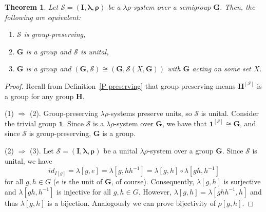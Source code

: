 \documentclass{amsart}
\newtheorem{theorem}{Theorem}
\newcommand{\blambda}{\boldsymbol{\lambda}}
\newcommand{\brho}{\boldsymbol{\rho}}
\begin{document}
\begin{theorem}\label{wr-prod}
Let $\mathcal{S} = (\mathbf{I},\blambda,\brho)$  be a
$\lambda\rho$-system over a semigroup $\mathbf{G}$.
Then, the following are equivalent:
\begin{enumerate}
\item $\mathcal{S}$ is group-preserving,
\item $\mathbf{G}$ is a group and $\mathcal{S}$ is unital,
\item $\mathbf{G}$ is a group and
  $(\mathbf{G},\mathcal{S})\cong (\mathbf{G},\mathcal{S}(X,\mathbf{G}))$
with $\mathbf{G}$ acting on some set $X$. 
\end{enumerate}
\end{theorem} 
\begin{proof}
Recall from Definition~\ref{P-preserving} that group-preserving means
$\mathbf{H}^{[\mathcal{S}]}$ is a group for any group $\mathbf{H}$.  

\smallskip\noindent
(1) $\Rightarrow$ (2). Group-preserving
$\lambda\rho$-systems preserve units, so 
$\mathcal{S}$ is unital.
Consider the trivial group $\mathbf{1}$.
Since $\mathcal{S}$ is a 
$\lambda\rho$-system over $\mathbf{G}$, we have that
$\mathbf{1}^{[\mathcal S]}\cong \mathbf{G}$, and
since $\mathcal{S}$ is group-preserving, 
$\mathbf{G}$ is a group.

\smallskip\noindent
(2) $\Rightarrow$ (3).
Let $\mathcal{S} = (\mathbf{I},\blambda,\brho)$  be a
unital $\lambda\rho$-system over a group $\mathbf{G}$.
Since $\mathcal{S}$ is unital, we have
$$
{id}_{I[g]}=\lambda[g,e]=\lambda [g,hh^{-1}] =
\lambda [g,h]\circ \lambda[gh,h^{-1}]
$$
for all $g,h\in G$ ($e$ is the unit of $\mathbf{G}$, of course).
Consequently, $\lambda [g,h]$ is surjective
and $\lambda [gh,h^{-1}]$ is injective for all $g,h\in G$. However,
$\lambda[g,h]=\lambda [ghh^{-1},h]$ and thus $\lambda[g,h]$ is a
bijection. Analogously we can prove bijectivity of $\rho[g,h]$. 
 

\end{proof}
\end{document}
